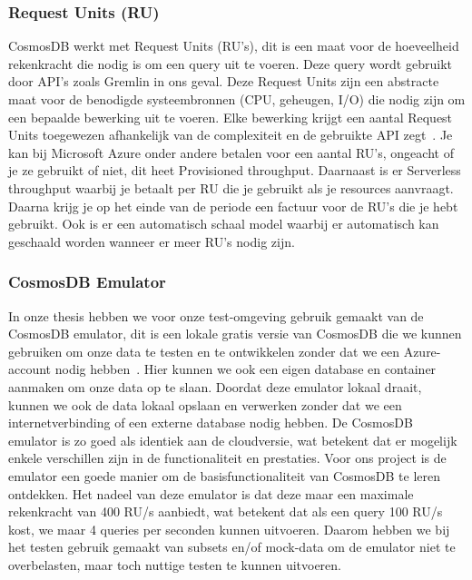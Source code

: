 \subsubsection{Request Units (RU)}
CosmosDB werkt met Request Units (RU's), dit is een maat voor de hoeveelheid rekenkracht die nodig is om een query uit te voeren.
Deze query wordt gebruikt door API's zoals Gremlin in ons geval. Deze Request Units zijn een abstracte maat voor de benodigde systeembronnen (CPU, geheugen, I/O) die nodig zijn om een bepaalde bewerking uit te voeren.
Elke bewerking krijgt een aantal Request Units toegewezen afhankelijk van de complexiteit en de gebruikte API zegt~\textcite{Brown2024}.
Je kan bij Microsoft Azure onder andere betalen voor een aantal RU's, ongeacht of je ze gebruikt of niet, dit heet Provisioned throughput.
Daarnaast is er Serverless throughput waarbij je betaalt per RU die je gebruikt als je resources aanvraagt. Daarna krijg je op het einde van de periode een factuur voor de RU's die je hebt gebruikt.
Ook is er een automatisch schaal model waarbij er automatisch kan geschaald worden wanneer er meer RU's nodig zijn.

\subsubsection{CosmosDB Emulator}
In onze thesis hebben we voor onze test-omgeving gebruik gemaakt van de CosmosDB emulator, dit is een lokale gratis versie van CosmosDB die we kunnen gebruiken om onze data te testen en te ontwikkelen zonder dat we een Azure-account nodig hebben~\autocite{Tharan2024}.
Hier kunnen we ook een eigen database en container aanmaken om onze data op te slaan. Doordat deze emulator lokaal draait, kunnen we ook de data lokaal opslaan en verwerken zonder dat we een internetverbinding of een externe database nodig hebben.
De CosmosDB emulator is zo goed als identiek aan de cloudversie, wat betekent dat er mogelijk enkele verschillen zijn in de functionaliteit en prestaties.
Voor ons project is de emulator een goede manier om de basisfunctionaliteit van CosmosDB te leren ontdekken.
Het nadeel van deze emulator is dat deze maar een maximale rekenkracht van 400 RU/s aanbiedt, wat betekent dat als een query 100 RU/s kost, we maar 4 queries per seconden kunnen uitvoeren.
Daarom hebben we bij het testen gebruik gemaakt van subsets en/of mock-data om de emulator niet te overbelasten, maar toch nuttige testen te kunnen uitvoeren.

